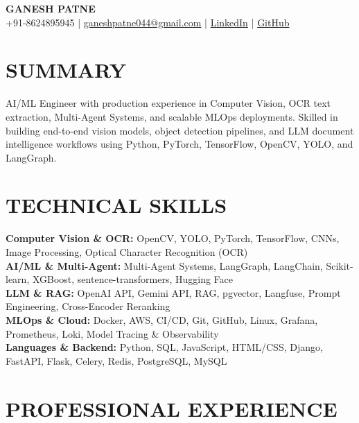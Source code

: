 \documentclass[10pt,a4paper]{article}
\begin{document}
\begin{center}
    {\fontsize{20}{22}\selectfont \textbf{GANESH PATNE}}\\[3pt]
    +91-8624895945 | \href{mailto:ganeshpatne044@gmail.com}{ganeshpatne044@gmail.com} | \href{https://linkedin.com/in/ganesh-patne}{LinkedIn} | \href{https://github.com/Ganeshpatne}{GitHub}
\end{center}
\vspace{-4pt}

\section*{SUMMARY}
AI/ML Engineer with production experience in Computer Vision, OCR text extraction, Multi-Agent Systems, and scalable MLOps deployments. Skilled in building end-to-end vision models, object detection pipelines, and LLM document intelligence workflows using Python, PyTorch, TensorFlow, OpenCV, YOLO, and LangGraph.

\vspace{1pt}

\section*{TECHNICAL SKILLS}
\textbf{Computer Vision \& OCR:} OpenCV, YOLO, PyTorch, TensorFlow, CNNs, Image Processing, Optical Character Recognition (OCR)\\
\textbf{AI/ML \& Multi-Agent:} Multi-Agent Systems, LangGraph, LangChain, Scikit-learn, XGBoost, sentence-transformers, Hugging Face\\
\textbf{LLM \& RAG:} OpenAI API, Gemini API, RAG, pgvector, Langfuse, Prompt Engineering, Cross-Encoder Reranking\\
\textbf{MLOps \& Cloud:} Docker, AWS, CI/CD, Git, GitHub, Linux, Grafana, Prometheus, Loki, Model Tracing \& Observability\\
\textbf{Languages \& Backend:} Python, SQL, JavaScript, HTML/CSS, Django, FastAPI, Flask, Celery, Redis, PostgreSQL, MySQL

\vspace{1pt}

\section*{PROFESSIONAL EXPERIENCE}
\end{document}
